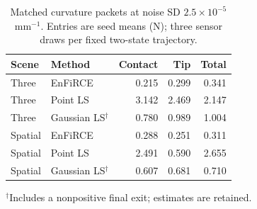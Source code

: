 \begin{table}[t]
\caption{Matched curvature packets at noise SD $2.5\times10^{-5}$ mm$^{-1}$. Entries are seed means (N); three sensor draws per fixed two-state trajectory.}
\label{tab:paired}
\centering\small
\begin{tabular}{llrrr}
\toprule
Scene & Method & Contact & Tip & Total\\
\midrule
Three & EnFiRCE & 0.215 & 0.299 & 0.341\\
Three & Point LS & 3.142 & 2.469 & 2.147\\
Three & Gaussian LS$^{\dagger}$ & 0.780 & 0.989 & 1.004\\
Spatial & EnFiRCE & 0.288 & 0.251 & 0.311\\
Spatial & Point LS & 2.491 & 0.590 & 2.655\\
Spatial & Gaussian LS$^{\dagger}$ & 0.607 & 0.681 & 0.710\\
\bottomrule
\end{tabular}
\par\smallskip\footnotesize $^{\dagger}$Includes a nonpositive final exit; estimates are retained.
\end{table}
